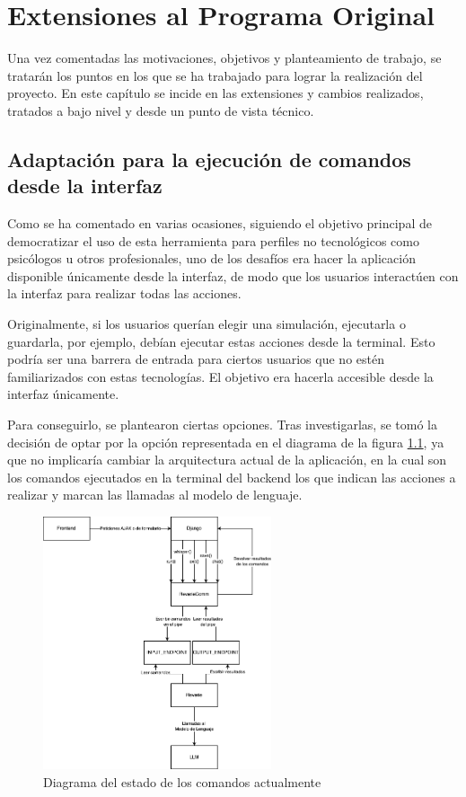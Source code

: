 \chapter{Extensiones al Programa Original}
\label{cap:extensiones}

Una vez comentadas las motivaciones, objetivos y planteamiento de trabajo, se tratarán los puntos en los que se ha trabajado para lograr la realización del proyecto. En este capítulo se incide en las extensiones y cambios realizados, tratados a bajo nivel y desde un punto de vista técnico.

\section{Adaptación para la ejecución de comandos desde la interfaz}
\label{section:adaptacionEjecucionComandosBackFront}

Como se ha comentado en varias ocasiones, siguiendo el objetivo principal de democratizar el uso de esta herramienta para perfiles no tecnológicos como psicólogos u otros profesionales, uno de los desafíos era hacer la aplicación disponible únicamente desde la interfaz, de modo que los usuarios interactúen con la interfaz para realizar todas las acciones.

Originalmente, si los usuarios querían elegir una simulación, ejecutarla o guardarla, por ejemplo, debían ejecutar estas acciones desde la terminal. Esto podría ser una barrera de entrada para ciertos usuarios que no estén familiarizados con estas tecnologías. El objetivo era hacerla accesible desde la interfaz únicamente.

Para conseguirlo, se plantearon ciertas opciones. Tras investigarlas, se tomó la decisión de optar por la opción representada en el diagrama de la figura \ref{fig:DiagramaComandos}, ya que no implicaría cambiar la arquitectura actual de la aplicación, en la cual son los comandos ejecutados en la terminal del backend los que indican las acciones a realizar y marcan las llamadas al modelo de lenguaje.

\begin{figure}[h]
	\centering
	\includegraphics[width = 0.6\textwidth]{Imagenes/Vectorial/DiagramaComandos.png}
	\caption{Diagrama del estado de los comandos actualmente}
	\label{fig:DiagramaComandos}
\end{figure}

